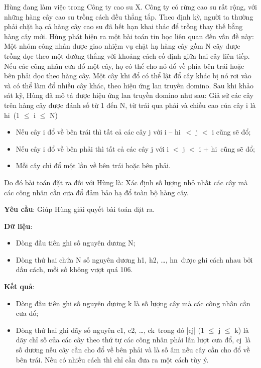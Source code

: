 

Hùng đang làm việc trong Công ty cao su X. Công ty có rừng cao su rất rộng, với những hàng cây cao su trồng cách đều thẳng tắp. Theo định kỳ, người ta thường phải chặt hạ cả hàng cây cao su đã hết hạn khai thác để trồng thay thế bằng hàng cây mới. Hùng phát hiện ra một bài toán tin học liên quan đến vấn đề này: Một nhóm công nhân được giao nhiệm vụ chặt hạ hàng cây gồm N cây được trồng dọc theo một đường thẳng với khoảng cách cố định giữa hai cây liên tiếp. Nếu các công nhân cưa đổ một cây, họ có thể cho nó đổ về phía bên trái hoặc bên phải dọc theo hàng cây. Một cây khi đổ có thể lật đổ cây khác bị nó rơi vào và có thể làm đổ nhiều cây khác, theo hiệu ứng lan truyền domino. Sau khi khảo sát kỹ, Hùng đã mô tả được hiệu ứng lan truyền domino như sau: Giả sử các cây trên hàng cây được đánh số từ 1 đến N, từ trái qua phải và chiều cao của cây i là hi (1  $\le$  i  $\le$  N)
\begin{itemize}
	\item Nếu cây i đổ về bên trái thì tất cả các cây j với i – hi $<$ j $<$ i cũng sẽ đổ;
	\item Nếu cây i đổ về bên phải thì tất cả các cây j với i $<$ j $<$ i + hi cũng sẽ đổ;
	\item Mỗi cây chỉ đổ một lần về bên trái hoặc bên phải.
\end{itemize}

Do đó bài toán đặt ra đối với Hùng là: Xác định số lượng nhỏ nhất các cây mà các công nhân cần cưa đổ đảm bảo hạ đổ toàn bộ hàng cây.

\textbf{Yêu cầu}: Giúp Hùng giải quyết bài toán đặt ra.

\textbf{Dữ liệu}:
\begin{itemize}
	\item Dòng đầu tiên ghi số nguyên dương N;
	\item Dòng thứ hai chứa N số nguyên dương h1, h2, …, hn được ghi cách nhau bởi dấu cách, mỗi số không vượt quá 106.
\end{itemize}

\textbf{Kết quả}:
\begin{itemize}
	\item Dòng đầu tiên ghi số nguyên dương k là số lượng cây mà các công nhân cần cưa đổ;
	\item Dòng thứ hai ghi dãy số nguyên c1, c2, …, ck trong đó |cj| (1  $\le$  j  $\le$  k) là dãy chỉ số của các cây theo thứ tự các công nhân phải lần lượt cưa đổ, cj là số dương nếu cây cần cho đổ về bên phải và là số âm nếu cây cần cho đổ về bên trái. Nếu có nhiều cách thì chỉ cần đưa ra một cách tùy ý.
\end{itemize}

